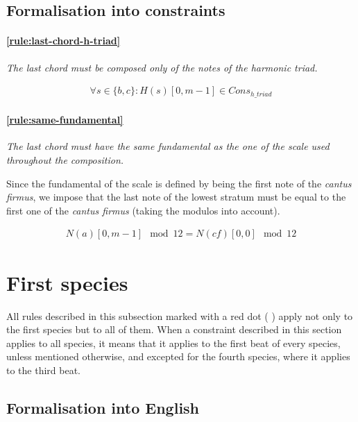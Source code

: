 \subsection{Formalisation into constraints} \label{sec:generalconstraints}
    \paragraph{\ref{rule:last-chord-h-triad}   } \textit{The last chord must be composed only of the notes of the harmonic triad.} 
    
    \begin{equation} \begin{aligned}
    \forall s \in \{b, c\} \colon H(s)[0, m-1] \in Cons_{h\_triad}
    \end{aligned} \end{equation}

    \paragraph{\ref{rule:same-fundamental}} \textit{The last chord must have the same fundamental as the one of the scale used throughout the composition.}\label{constraint:same-fundamental}

    Since the fundamental of the scale is defined by being the first note of the \textit{cantus firmus}, we impose that the last note of the lowest stratum must be equal to the first one of the \textit{cantus firmus} (taking the modulos into account).
    
    
    \begin{equation} \begin{aligned}
    N(a)[0, m-1] \mod 12 = N(cf)[0, 0] \mod 12
    \end{aligned} \end{equation}

\section{First species}
All rules described in this subsection marked with a red dot ( \reddot) apply not only to the first species but to all of them. When a constraint described in this section applies to all species, it means that it applies to the first beat of every species, unless mentioned otherwise, and excepted for the fourth species, where it applies to the third beat.

\subsection{Formalisation into English}
